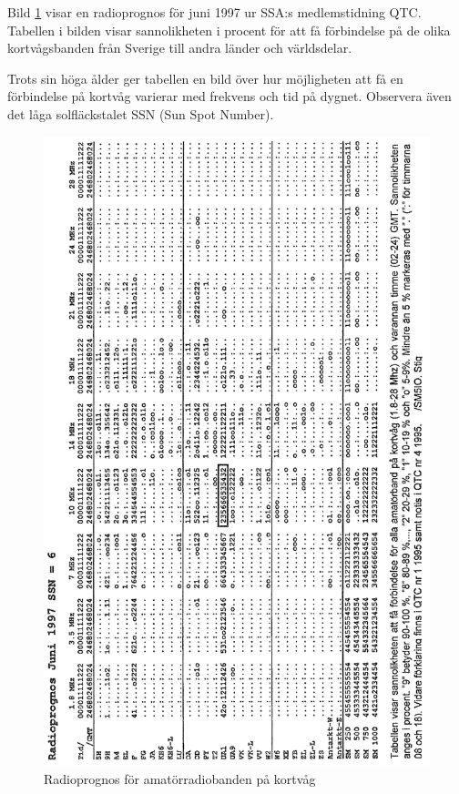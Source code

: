 Bild \ref{fig:bildII7-9} visar en radioprognos för juni 1997 ur SSA:s
medlemstidning QTC.
Tabellen i bilden visar sannolikheten i procent för att få förbindelse på de
olika kortvågsbanden från Sverige till andra länder och världsdelar.

Trots sin höga ålder ger tabellen en bild över hur möjligheten att få en
förbindelse på kortvåg varierar med frekvens och tid på dygnet.
Observera även det låga solfläckstalet SSN (Sun Spot Number).

\begin{figure}
  \includegraphics[width=\textwidth]{images/cropped_pdfs/bild_2_7-09.pdf}
  \caption{Radioprognos för amatörradiobanden på kortvåg}
  \label{fig:bildII7-9}
\end{figure}
